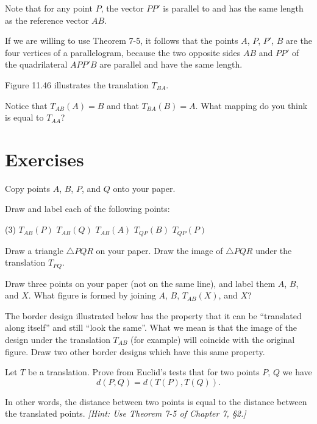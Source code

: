 \documentclass[12pt]{book} %
\begin{document}
\begin{ExerciseList}

Note that for any point $P$, the vector $PP'$ is parallel to and has the same
length as the reference vector $AB$.

If we are willing to use Theorem 7-5, it follows that the points $A$, $P$,
$P'$, $B$ are the four vertices of a parallelogram, because the two opposite
sides $AB$ and $PP'$ of the quadrilateral $APP'B$ are parallel and have the
same length.

Figure 11.46 illustrates the translation $T_{BA}$.


Notice that $T_{AB}(A)=B$ and that $T_{BA}(B)=A$. What mapping do you
think is equal to $T_{AA}$?

\section*{Exercises}

\setcounter{Exercise}{0}
\begin{ExerciseList}
\Exercise Copy points $A$, $B$, $P$, and $Q$ onto your paper.


Draw and label each of the following points:
\begin{tasks}(3)
\task[(a)] $T_{AB}(P)$
\task[(b)] $T_{AB}(Q)$
\task[(c)] $T_{AB}(A)$
\task[(d)] $T_{QP}(B)$
\task[(e)] $T_{QP}(P)$
\end{tasks}

\Exercise Draw a triangle $\triangle PQR$ on your paper. Draw the image of $\triangle PQR$ under the
translation $T_{PQ}$.

\Exercise Draw three points on your paper (not on the same line), and label them $A$, $B$,
and $X$. What figure is formed by joining $A$, $B$, $T_{AB}(X)$, and $X$?

\Exercise The border design illustrated below has the property that it can be ``translated
along itself'' and still ``look the same''. What we mean is that the image of
the design under the translation $T_{AB}$ (for example) will coincide with the original figure. Draw two other border designs which have this same property.


\Exercise Let $T$ be a translation. Prove from Euclid's tests that for two points $P$, $Q$ we
have
\[
d(P,Q)=d(T(P),T(Q)).
\]

In other words, the distance between two points is equal to the distance between the translated points. \textit{[Hint: Use Theorem 7-5 of Chapter 7, \S2.]}
\end{ExerciseList}


\end{ExerciseList}
\end{document}
